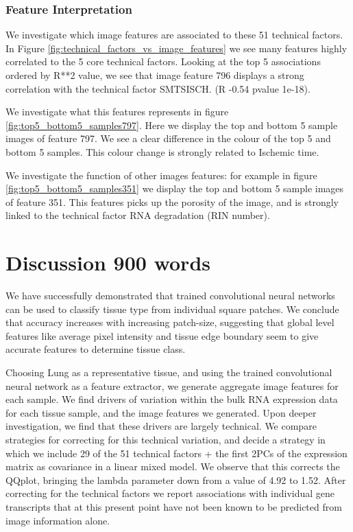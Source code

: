 \documentclass[graybox]{svmult}
\begin{document}
\subsubsection{Feature Interpretation}

We investigate which image features are associated to these 51 technical factors. In Figure \ref{fig:technical_factors_vs_image_features} we see many features highly correlated to the 5 core technical factors. Looking at the top 5 associations ordered by R**2 value, we see that image feature 796 displays a strong correlation with the technical factor SMTSISCH. (R -0.54 pvalue 1e-18).

We investigate what this features represents in figure \ref{fig:top5_bottom5_samples797}. Here we display the top and bottom 5 sample images of feature 797. We see a clear difference in the colour of the top 5 and bottom 5 samples. This colour change is strongly related to Ischemic time.

We investigate the function of other images features: for example in figure \ref{fig:top5_bottom5_samples351} we display the top and bottom 5 sample images of feature 351. This features picks up the porosity of the image, and is strongly linked to the technical factor RNA degradation (RIN number).



\section{Discussion 900 words}

We have successfully demonstrated that trained convolutional neural networks can be used to classify tissue type from individual square patches. We conclude that accuracy increases with increasing patch-size, suggesting that global level features like average pixel intensity and tissue edge boundary seem to give accurate features to determine tissue class.

Choosing Lung as a representative tissue, and using the trained convolutional neural network as a feature extractor, we generate aggregate image features for each sample. We find drivers of variation within the bulk RNA expression data for each tissue sample, and the image features we generated. Upon deeper investigation, we find that these drivers are largely technical. We compare strategies for correcting for this technical variation, and decide a strategy in which we include 29 of the 51 technical factors + the first 2PCs of the expression matrix as covariance in a linear mixed model. We observe that this corrects the QQplot, bringing the lambda parameter down from a value of 4.92 to 1.52. After correcting for the technical factors we report associations with individual gene transcripts that at this present point have not been known to be predicted from image information alone.
\end{document}
